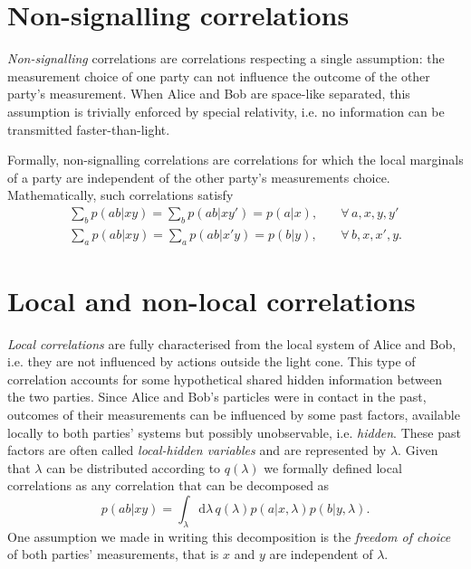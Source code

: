 \section{Non-signalling correlations}

\textit{Non-signalling} correlations are correlations respecting a single assumption: the measurement choice of one party can not influence the outcome of the other party's measurement.
When Alice and Bob are space-like separated, this assumption is trivially enforced by special relativity, i.e. no information can be transmitted faster-than-light.

Formally, non-signalling correlations are correlations for which the local marginals of a party are independent of the other party's measurements choice. 
Mathematically, such correlations satisfy
\begin{equation}
	\begin{split}
		\sum_b p(ab|xy) = \sum_b p(ab|xy') = p(a|x), \quad &\forall\,a,x,y,y' \\
		\sum_a p(ab|xy) = \sum_a p(ab|x'y) = p(b|y), \quad &\forall\,b,x,x',y.
	\end{split}
	\label{eq:non-signalling}
\end{equation}

\pagebreak 

\section{Local and non-local correlations}

\textit{Local correlations} are fully characterised from the local system of Alice and Bob, i.e. they are not influenced by actions outside the light cone.
This type of correlation accounts for some hypothetical shared hidden information between the two parties.
Since Alice and Bob's particles were in contact in the past, outcomes of their measurements can be influenced by some past factors, available locally to both parties' systems but possibly unobservable, i.e. \textit{hidden}.
These past factors are often called \textit{local-hidden variables} and are represented by $\lambda$.
Given that $\lambda$ can be distributed according to $q(\lambda)$ we formally defined local correlations as any correlation that can be decomposed as
\begin{equation}
	p(ab|xy) = \int_\lambda \mathrm{d}\lambda \, q(\lambda) p(a|x,\lambda) p(b|y,\lambda).
	\label{eq:local}
\end{equation}
One assumption we made in writing this decomposition is the \textit{freedom of choice} of both parties' measurements, that is $x$ and $y$ are independent of $\lambda$.

